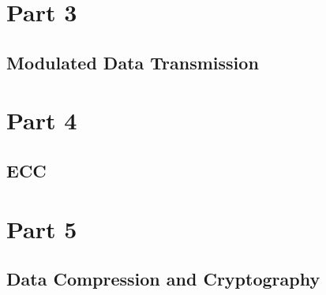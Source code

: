 \documentclass[a4paper]{article}
\begin{document}
\section{Part 3}
\subsection{Modulated Data Transmission}

\section{Part 4}
\subsection{ECC}

\section{Part 5}
\subsection{Data Compression and Cryptography}
\end{document}
